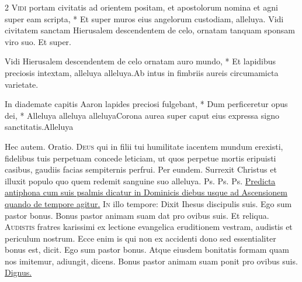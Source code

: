 \begin{multicols*}{2}
\lettrine[lines=2]{\zallmancaps \color{Red} V}{idi} \hypertarget{vidi-portam}{\label{vidi-portam}} portam civitatis ad orientem positam, et apostolorum nomina et agni super eam scripta, * Et super muros eius angelorum custodiam, alleluya. \V Vidi civitatem sanctam Hierusalem descendentem de celo, ornatam tanquam sponsam viro suo. Et super.
\begin{responsory}
{Vidi Hierusalem descendentem de celo ornatam auro mundo, * Et lapidibus preciosis intextam, alleluya alleluya.}{Ab intus in fimbriis aureis circumamicta varietate.}%
\end{responsory}%
\begin{responsory-final}[in-diademate]
{In diademate capitis Aaron lapides preciosi fulgebant, * Dum perficeretur opus dei, * Alleluya alleluya alleluya}{Corona aurea super caput eius expressa signo sanctitatis.}{Alleluya}
\end{responsory-final}%
{\color{Red} }
 Hec autem. {\color{Red} Oratio.}
\lettrine[lines=2]{\zallmancaps \color{Blue} D}{eus} qui in filii tui humilitate iacentem mundum erexisti, fidelibus tuis perpetuam concede leticiam, ut quos perpetue mortis eripuisti casibus, gaudiis facias sempiternis perfrui. Per eundem.
 Surrexit Christus et illuxit populo quo quem redemit sanguine suo alleluya. {\color{Red} Ps.}  {\color{Red} Ps.}  {\color{Red} Ps.} 
\newline \ul{Predicta antiphona cum suis psalmis dicatur in Dominicis diebus usque ad Ascensionem quando de tempore agitur.}
\lettrine[lines=2]{\zallmancaps \color{Red} I}{n} illo tempore: Dixit Ihesus discipulis suis. Ego sum pastor bonus. Bonus pastor animam suam dat pro ovibus suis. Et reliqua.
\lettrine[lines=2]{\zallmancaps \color{Blue} A}{udistis} fratres karissimi ex lectione evangelica eruditionem vestram, audistis et periculum nostrum. Ecce enim is qui non ex accidenti dono sed essentialiter bonus est, dicit. Ego sum pastor bonus. Atque eiusdem bonitatis formam quam nos imitemur, adiungit, dicens. Bonus pastor animam suam ponit pro ovibus suis. \R \hyperlink{dignus-es}{Dignus.}

\end{multicols*}
